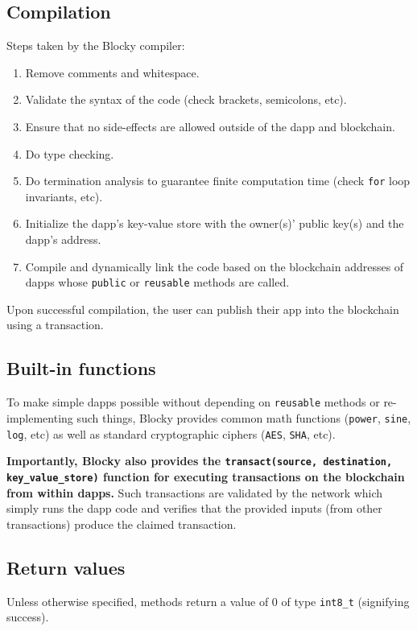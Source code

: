 \documentclass[letterpaper]{article}
\begin{document}
\subsection{Compilation}
Steps taken by the Blocky compiler:
\begin{enumerate}
  \item{Remove comments and whitespace.}
  \item{Validate the syntax of the code (check brackets, semicolons, etc).}
  \item{Ensure that no side-effects are allowed outside of the dapp and blockchain.}
  \item{Do type checking.}
  \item{Do termination analysis to guarantee finite computation time (check \texttt{for} loop invariants, etc).}
  \item{Initialize the dapp's key-value store with the owner(s)' public key(s) and the dapp's address.}
  \item{Compile and dynamically link the code based on the blockchain addresses of dapps whose \texttt{public} or \texttt{reusable} methods are called.}
\end{enumerate}

Upon successful compilation, the user can publish their app into the blockchain using a transaction.

\subsection{Built-in functions}
To make simple dapps possible without depending on \texttt{reusable} methods or re-implementing such things, Blocky provides common math functions (\texttt{power}, \texttt{sine}, \texttt{log}, etc) as well as standard cryptographic ciphers (\texttt{AES}, \texttt{SHA}, etc).

\textbf{Importantly, Blocky also provides the \texttt{transact(source, destination, key\_value\_store)} function for executing transactions on the blockchain from within dapps.} Such transactions are validated by the network which simply runs the dapp code and verifies that the provided inputs (from other transactions) produce the claimed transaction.

\subsection{Return values}
Unless otherwise specified, methods return a value of 0 of type \texttt{int8\_t} (signifying success).
\end{document}

